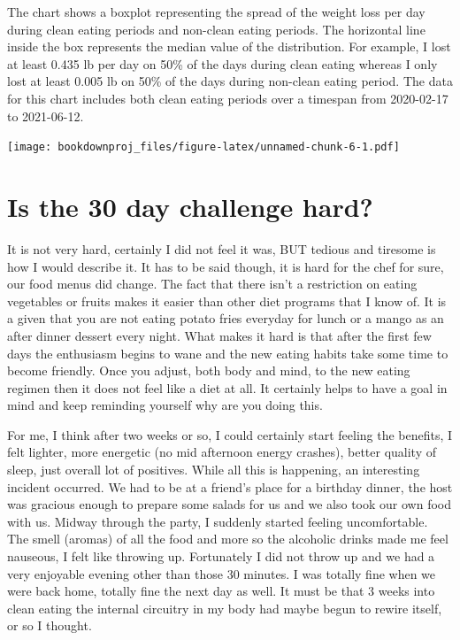 \documentclass[
  oneside]{book}
\begin{document}
The chart shows a boxplot representing the spread of the weight loss per day during clean eating periods and non-clean eating periods. The horizontal line inside the box represents the median value of the distribution. For example, I lost at least 0.435 lb per day on 50\% of the days during clean eating whereas I only lost at least 0.005 lb on 50\% of the days during non-clean eating period. The data for this chart includes both clean eating periods over a timespan from 2020-02-17 to 2021-06-12.

\texttt{[image: bookdownproj\_files/figure-latex/unnamed-chunk-6-1.pdf]}

\hypertarget{is-the-30-day-challenge-hard}{%
\section{Is the 30 day challenge hard?}\label{is-the-30-day-challenge-hard}}

It is not very hard, certainly I did not feel it was, BUT tedious and tiresome is how I would describe it. It has to be said though, it is hard for the chef for sure, our food menus did change. The fact that there isn't a restriction on eating vegetables or fruits makes it easier than other diet programs that I know of. It is a given that you are not eating potato fries everyday for lunch or a mango as an after dinner dessert every night. What makes it hard is that after the first few days the enthusiasm begins to wane and the new eating habits take some time to become friendly. Once you adjust, both body and mind, to the new eating regimen then it does not feel like a diet at all. It certainly helps to have a goal in mind and keep reminding yourself why are you doing this.

For me, I think after two weeks or so, I could certainly start feeling the benefits, I felt lighter, more energetic (no mid afternoon energy crashes), better quality of sleep, just overall lot of positives. While all this is happening, an interesting incident occurred. We had to be at a friend's place for a birthday dinner, the host was gracious enough to prepare some salads for us and we also took our own food with us. Midway through the party, I suddenly started feeling uncomfortable. The smell (aromas) of all the food and more so the alcoholic drinks made me feel nauseous, I felt like throwing up. Fortunately I did not throw up and we had a very enjoyable evening other than those 30 minutes. I was totally fine when we were back home, totally fine the next day as well. It must be that 3 weeks into clean eating the internal circuitry in my body had maybe begun to rewire itself, or so I thought.
\end{document}
